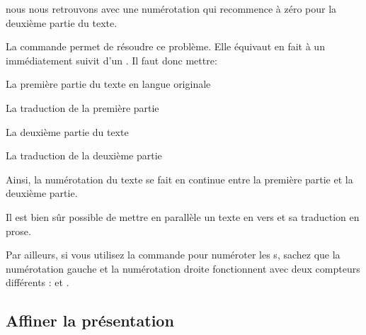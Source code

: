 nous nous retrouvons avec une numérotation qui recommence à zéro pour la deuxième partie du texte. 

La commande  permet de résoudre ce problème. Elle équivaut en fait à un  immédiatement suivit d'un . Il faut donc mettre: 

\begin{latexcode}
\begin{pages}  
\begin{Leftside}  \beginnumbering 
La première partie du texte en langue originale
\end{Leftside} %
 
\begin{Rightside} \beginnumbering
La traduction de la première partie
\end{Rightside} %
\Pages
 
\begin{Leftside} \memorydump %
La deuxième partie du texte 
\endnumbering  \end{Leftside}
    
\begin{Rightside}  \memorydump %
La traduction de la deuxième partie
\endnumbering \end{Rightside}   %
 
 \Pages

\end{pages}
\end{latexcode}

Ainsi, la numérotation du texte se fait en continue entre la première partie et la deuxième partie.


\begin{plusloins}
Il est bien sûr possible de mettre en parallèle un texte en vers et sa traduction en prose. 

Par ailleurs, si vous utilisez la commande  pour numéroter les s, sachez que la numérotation gauche et la numérotation droite fonctionnent avec deux compteurs différents :  et .
\end{plusloins}




\subsection{Affiner la présentation}


